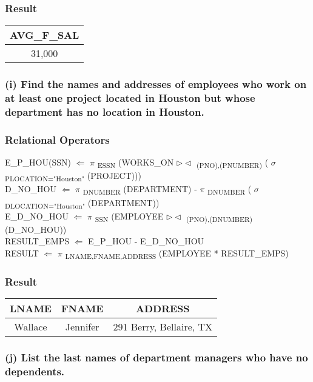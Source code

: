 \subsubsection*{Result}
\begin{center}
\begin{tabular}{ c }
  AVG\_F\_SAL \\ \hline
  31,000 \\
\end{tabular}
\end{center}

\subsubsection*{(i) Find the names and addresses of employees who work on at least one project located in Houston but whose department has no location in Houston.}
\subsubsection*{Relational Operators}
E\_P\_HOU(SSN) $\Leftarrow$ $\pi$ \textsubscript{ESSN} (WORKS\_ON $\rhd\lhd$ \textsubscript{(PNO),(PNUMBER)} ( $\sigma$ \textsubscript{PLOCATION="Houston"} (PROJECT)))\\
D\_NO\_HOU $\Leftarrow$ $\pi$ \textsubscript{DNUMBER} (DEPARTMENT) - $\pi$ \textsubscript{DNUMBER} ( $\sigma$ \textsubscript{DLOCATION="Houston"} (DEPARTMENT))\\
E\_D\_NO\_HOU $\Leftarrow$ $\pi$ \textsubscript{SSN} (EMPLOYEE  $\rhd\lhd$ \textsubscript{(PNO),(DNUMBER)} (D\_NO\_HOU))\\
RESULT\_EMPS $\Leftarrow$ E\_P\_HOU - E\_D\_NO\_HOU \\
RESULT $\Leftarrow$ $\pi$ \textsubscript{LNAME,FNAME,ADDRESS} (EMPLOYEE * RESULT\_EMPS)

\subsubsection*{Result}
\begin{center}
\begin{tabular}{ c | c | c}
  LNAME & FNAME  & ADDRESS \\ \hline
  Wallace & Jennifer & 291 Berry, Bellaire, TX \\
\end{tabular}
\end{center}

\subsubsection*{(j) List the last names of department managers who have no dependents.}

